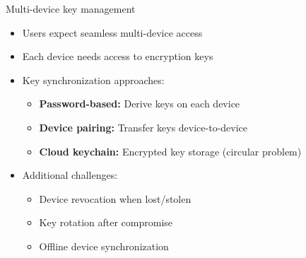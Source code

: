 \ifdefined\PRESENTATION\else\PassOptionsToClass{handout}{beamer}\fi\documentclass[aspectratio=169, lualatex]{beamer}
\begin{document}
\begin{frame}{Multi-device key management}
	\begin{itemize}
		\item Users expect seamless multi-device access
		\item Each device needs access to encryption keys
		\item Key synchronization approaches:
		      \begin{itemize}
			      \item \textbf{Password-based:} Derive keys on each device
			      \item \textbf{Device pairing:} Transfer keys device-to-device
			      \item \textbf{Cloud keychain:} Encrypted key storage (circular problem)
		      \end{itemize}
		\item Additional challenges:
		      \begin{itemize}
			      \item Device revocation when lost/stolen
			      \item Key rotation after compromise
			      \item Offline device synchronization
		      \end{itemize}
	\end{itemize}
\end{frame}
\end{document}
